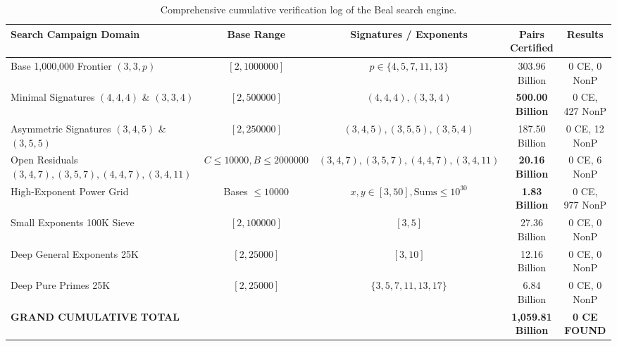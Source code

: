 \documentclass[11pt,reqno]{amsart}
\theoremstyle{definition}
\theoremstyle{remark}
\numberwithin{equation}{section}
\begin{document}
\begin{table}[ht]
\centering
\caption{Comprehensive cumulative verification log of the Beal search engine.}
\label{tab:search_log}
\begin{tabular}{lcccc}
\toprule
Search Campaign Domain & Base Range & Signatures / Exponents & Pairs Certified & Results \\
\midrule
Base 1,000,000 Frontier $(3, 3, p)$ & $[2, 1000000]$ & $p \in \{4, 5, 7, 11, 13\}$ & 303.96 Billion & 0 CE, 0 NonP \\
Minimal Signatures $(4, 4, 4)$ \& $(3, 3, 4)$ & $[2, 500000]$ & $(4, 4, 4), (3, 3, 4)$ & \textbf{500.00 Billion} & 0 CE, 427 NonP \\
Asymmetric Signatures $(3, 4, 5)$ \& $(3, 5, 5)$ & $[2, 250000]$ & $(3, 4, 5), (3, 5, 5), (3, 5, 4)$ & 187.50 Billion & 0 CE, 12 NonP \\
Open Residuals $(3, 4, 7), (3, 5, 7), (4, 4, 7), (3, 4, 11)$ & $C \le 10000, B \le 2000000$ & $(3, 4, 7), (3, 5, 7), (4, 4, 7), (3, 4, 11)$ & \textbf{20.16 Billion} & 0 CE, 6 NonP \\
High-Exponent Power Grid & Bases $\le 10000$ & $x, y \in [3, 50], \text{Sums} \le 10^{30}$ & \textbf{1.83 Billion} & 0 CE, 977 NonP \\
Small Exponents 100K Sieve & $[2, 100000]$ & $[3, 5]$ & 27.36 Billion & 0 CE, 0 NonP \\
Deep General Exponents 25K & $[2, 25000]$ & $[3, 10]$ & 12.16 Billion & 0 CE, 0 NonP \\
Deep Pure Primes 25K & $[2, 25000]$ & $\{3, 5, 7, 11, 13, 17\}$ & 6.84 Billion & 0 CE, 0 NonP \\
\midrule
\textbf{GRAND CUMULATIVE TOTAL} & & & \textbf{1,059.81 Billion} & \textbf{0 CE FOUND} \\
\bottomrule
\end{tabular}
\end{table}
\end{document}
